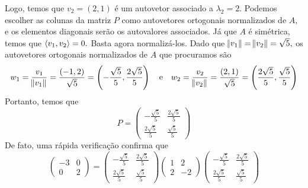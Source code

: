 \documentclass[11pt,a4paper]{article}
\begin{document}
{{Logo, temos que $v_2 = (2,1)$ é um autovetor associado a $\lambda_2 = 2.$ 
Podemos escolher as colunas da matriz $P$ como autovetores ortogonais normalizados de $A,$ e os elementos diagonais serão os autovalores associados.
Já que $A$ é simétrica, temos que $\left\langle v_1, v_2 \right\rangle = 0.$ Basta agora normalizá-los. Dado que $\norm{v_1} = \norm{v_2} = \sqrt{5},$ os autovetores ortogonais normalizados de $A$ que procuramos são
\[
w_1 = \frac{v_1}{\norm{v_1}} = \frac{(-1,2)}{\sqrt{5}} = \left(-\frac{\sqrt{5}}{5}, \frac{2 \sqrt{5}}{5} \right) \quad \mbox{e} \quad w_2 = \frac{v_2}{\norm{v_2}} = \frac{(2,1)}{\sqrt{5}} = \left(\frac{2\sqrt{5}}{5}, \frac{ \sqrt{5}}{5} \right) 
\]
Portanto, temos que
\[
P = \begin{pmatrix}
-\frac{\sqrt{5}}{5} & \frac{2\sqrt{5}}{5} \\
\frac{2 \sqrt{5}}{5} & \frac{\sqrt{5}}{5} 
\end{pmatrix}
\]
De fato, uma rápida verificação confirma que
\[
 \begin{pmatrix}
-3 & 0 \\
0 & 2
\end{pmatrix} = \begin{pmatrix}
-\frac{\sqrt{5}}{5} & \frac{2\sqrt{5}}{5} \\
\frac{2 \sqrt{5}}{5} & \frac{\sqrt{5}}{5} 
\end{pmatrix}
 \begin{pmatrix}
1 & 2 \\
2 & -2
\end{pmatrix}
\begin{pmatrix}
-\frac{\sqrt{5}}{5} & \frac{2\sqrt{5}}{5} \\
\frac{2 \sqrt{5}}{5} & \frac{\sqrt{5}}{5} 
\end{pmatrix}
\]

}}
\end{document}
